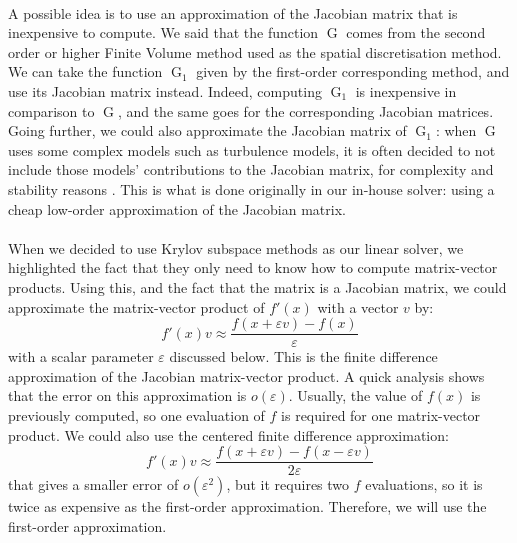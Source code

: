       \paragraph{}
      A possible idea is to use an approximation of the Jacobian matrix that is inexpensive to compute.
      We said that the function $\operatorname{G}$ comes from the second order or higher Finite Volume method used as the spatial discretisation method.
      We can take the function $\operatorname{G}_1$ given by the first-order corresponding method, and use its Jacobian matrix instead.
      Indeed, computing $\operatorname{G}_1$ is inexpensive in comparison to $\operatorname{G}$, and the same goes for the corresponding Jacobian matrices.
      Going further, we could also approximate the Jacobian matrix of $\operatorname{G}_1$: when $\operatorname{G}$ uses some complex models such as turbulence models, it is often decided to not include those models' contributions to the Jacobian matrix, for complexity and stability reasons .
      This is what is done originally in our in-house solver: using a cheap low-order approximation of the Jacobian matrix.

      \paragraph{}
      When we decided to use Krylov subspace methods as our linear solver, we highlighted the fact that they only need to know how to compute matrix-vector products.
      Using this, and the fact that the matrix is a Jacobian matrix, we could approximate the matrix-vector product of $f'\left(x\right)$ with a vector $v$ by:
      \begin{equation}\label{eq:matrix_free}
        f'\left(x\right) v \approx \frac{f\left(x + \varepsilon v\right) - f\left(x\right)}{\varepsilon}
      \end{equation}
      with a scalar parameter $\varepsilon$ discussed below.
      This is the finite difference approximation of the Jacobian matrix-vector product.
      A quick analysis shows that the error on this approximation is $o\left(\varepsilon\right)$.
      Usually, the value of $f\left(x\right)$ is previously computed, so one evaluation of $f$ is required for one matrix-vector product.
      We could also use the centered finite difference approximation:
      \begin{equation}
        f'\left(x\right) v \approx \frac{f\left(x + \varepsilon v\right) - f\left(x - \varepsilon v\right)}{2\varepsilon}
      \end{equation}
      that gives a smaller error of $o\left(\varepsilon^2\right)$, but it requires two $f$ evaluations, so it is twice as expensive as the first-order approximation.
      Therefore, we will use the first-order approximation.

